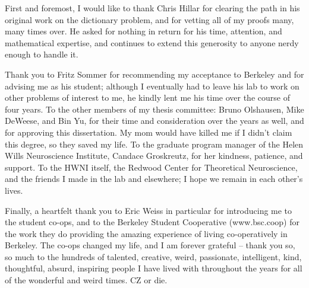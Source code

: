 \documentclass{ucbthesis}
\begin{document}
\begin{frontmatter}

\tableofcontents
\clearpage
\listoffigures
\clearpage

\begin{acknowledgements}
First and foremost, I would like to thank Chris Hillar for clearing the path in his original work on the dictionary problem, and for vetting all of my proofs many, many times over. He asked for nothing in return for his time, attention, and mathematical expertise, and continues to extend this generosity to anyone nerdy enough to handle it. 

Thank you to Fritz Sommer for recommending my acceptance to Berkeley and for advising me as his student; although I eventually had to leave his lab to work on other problems of interest to me, he kindly lent me his time over the course of four years. 
To the other members of my thesis committee: Bruno Olshausen, Mike DeWeese, and Bin Yu, for their time and consideration over the years as well, and for approving this dissertation. My mom would have killed me if I didn't claim this degree, so they saved my life. 
To the graduate program manager of the Helen Wills Neuroscience Institute, Candace Groskreutz, for her kindness, patience, and support. 
To the HWNI itself, the Redwood Center for Theoretical Neuroscience, and the friends I made in the lab and elsewhere; I hope we remain in each other's lives. 

Finally, a heartfelt thank you to Eric Weiss in particular for introducing me to the student co-ops, and to the Berkeley Student Cooperative (www.bsc.coop) for the work they do providing the amazing experience of living co-operatively in Berkeley. The co-ops changed my life, and I am forever grateful -- thank you so, so much to the hundreds of talented, creative, weird, passionate, intelligent, kind, thoughtful, absurd, inspiring people I have lived with throughout the years for all of the wonderful and weird times. CZ or die. 
\end{acknowledgements}

\end{frontmatter}

\pagestyle{headings}


 
 





% 

\printbibliography
\end{document}
